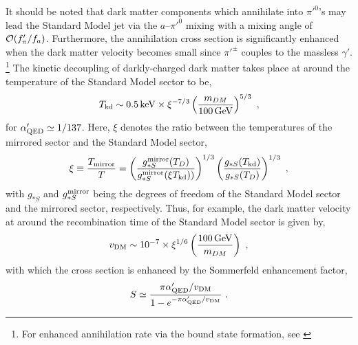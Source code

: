 \documentclass[aps,amsmath,preprint,epsf,superscriptaddress,nofootinbib,notitlepage]{revtex4-1}
\begin{document}
It should be noted that dark matter components which annihilate into $\pi'^0$'s may lead the Standard Model jet via the $a$--$\pi'^0$ mixing with a mixing angle of ${\cal O}(f_\pi'/f_a)$.
 Furthermore, the annihilation cross section is significantly enhanced when the dark matter velocity becomes small
 since  $\pi'^\pm$ couples to the massless $\gamma'$.%
\footnote{For enhanced annihilation rate via the bound state formation, 
see \cite{Feng:2009mn,vonHarling:2014kha,Petraki:2015hla,An:2016gad,Petraki:2016cnz} }
The kinetic decoupling of darkly-charged dark matter takes place at around 
the temperature of the Standard Model sector to be,
\begin{eqnarray}
T_{\rm kd}\sim 0.5\,{\rm keV} \times \xi^{-7/3}\left(\frac{m_{DM}}{100\,\rm GeV}\right)^{5/3} \ ,
\end{eqnarray}
for $\alpha_{\rm QED}' \simeq 1/137$. 
Here, $\xi$ denotes the ratio between the temperatures of the mirrored sector and the Standard Model sector,
\begin{eqnarray}
\xi \equiv \frac{T_{\rm mirror}}{T} = \left(\frac{g_{*S}^{\rm mirror}(T_D)}{g_{*S}^{\rm mirror}(\xi T_{\rm kd}))}\right)^{1/3}
\left(\frac{g_{*S}(T_{\rm kd})}{g_{*S}(T_D)}\right)^{1/3}\ ,
\end{eqnarray}
with $g_{*S}$ and $g_{*S}^{\rm mirror}$ being the degrees of freedom of the Standard Model sector 
and the mirrored sector, respectively.
Thus, for example, the dark matter velocity at around the recombination time of the Standard Model sector is given by,
\begin{eqnarray}
v_{\rm DM} \sim 10^{-7}\times  \xi^{1/6} 
\left(\frac{100\,\rm GeV}{m_{DM}}\right)\ ,
\end{eqnarray}
with which the cross section is enhanced by the Sommerfeld enhancement factor,
\begin{eqnarray}
S \simeq  \frac{\pi \alpha_{\rm QED}'/v_{\rm DM}}
{1- e^{-\pi \alpha_{\rm QED}'/v_{\rm DM} }} \ .
\end{eqnarray}
\end{document}
